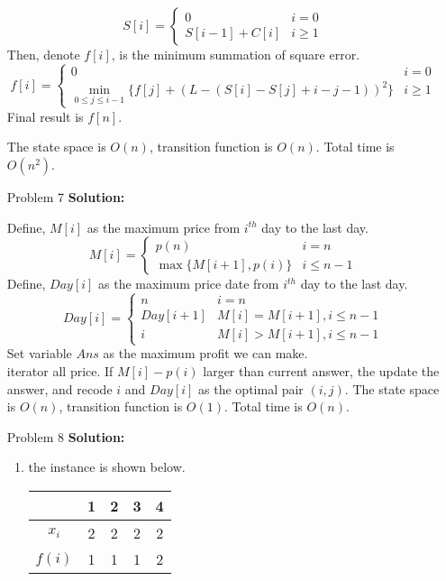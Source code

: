 \normalfont\documentclass[letterpaper,11pt]{article}
\begin{document}
\begin{enumerate}
	$$ S[i]=\left\{
		\begin{array}{ll}
		0   &    i = 0\\
		S[i-1] + C[i] &           i \ge 1
		\end{array} \right. 
	$$
	Then, denote $f[i]$, is the minimum summation of square error.\\
	$$ f[i]=\left\{
		\begin{array}{ll}
		0   &    i = 0\\
		\min \limits_{0 \le j \le i -1}\{f[j] + (L - (S[i] - S[j] + i - j - 1))^2\} &           i \ge 1
		\end{array} \right. 
	$$
	Final result is $f[n]$.\par
	The state space is $O(n)$, transition function is $O(n)$. Total time is $O(n^2)$.
\item [Problem 7]\textbf{Solution:}\par
	Define, $M[i]$ as the maximum price from $i^{th}$ day to the last day.
	$$ M[i]=\left\{
		\begin{array}{ll}
		p(n)   &    i = n\\
		\max\{M[i + 1], p(i)\} &           i \le n - 1
		\end{array} \right. 
	$$
	Define, $Day[i]$ as the maximum price date from $i^{th}$ day to the last day.
	$$ Day[i]=\left\{
		\begin{array}{ll}
		n   &    i = n\\
		Day[i + 1]   &    M[i] = M[i+1], i \le n - 1\\
		i & M[i] > M[i+1], i \le n - 1
		\end{array} \right. 
	$$
	Set variable $Ans$ as the maximum profit we can make.\\
	iterator all price. If $M[i] - p(i)$ larger than current answer, the update the answer, and recode $i$ and $Day[i]$ as the optimal pair $(i,j)$.
	The state space is $O(n)$, transition function is $O(1)$. Total time is $O(n)$.
\item [Problem 8]\textbf{Solution:}\par
\begin{enumerate}
	\item the instance is shown below.\par
		\begin{tabular}{|c|c|c|c|c|}
			\hline
			& 1&  2 &  3 &  4   \\
			\hline
			$x_i$ & 2 & 2 & 2 & 2 \\
			\hline
			$f(i)$ & 1 & 1 & 1 & 2 \\
			\hline
		\end{tabular}\par

\end{enumerate}
\end{enumerate}
\end{document}

